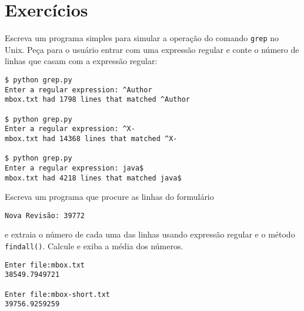 \section{Exercícios}

\begin{ex}
Escreva um programa simples para simular a operação do comando {\tt grep} 
no Unix. Peça para o usuário entrar com uma expressão regular e conte o 
número de linhas que casam com a expressão regular:

\beforeverb
\begin{verbatim}
$ python grep.py
Enter a regular expression: ^Author
mbox.txt had 1798 lines that matched ^Author

$ python grep.py
Enter a regular expression: ^X-
mbox.txt had 14368 lines that matched ^X-

$ python grep.py
Enter a regular expression: java$
mbox.txt had 4218 lines that matched java$
\end{verbatim}
\afterverb
%
\end{ex}

\begin{ex}
Escreva um programa que procure as linhas do formulário

\verb"Nova Revisão: 39772"

e extraia o número de cada uma das linhas usando expressão regular e o 
método {\tt findall()}. Calcule e exiba a média dos números.

\beforeverb
\begin{verbatim}
Enter file:mbox.txt 
38549.7949721

Enter file:mbox-short.txt
39756.9259259
\end{verbatim}
\afterverb
%

\end{ex}